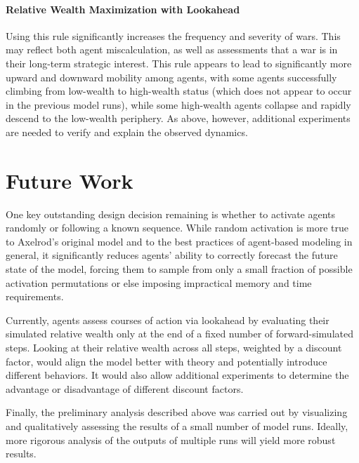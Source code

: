 \documentclass{article}
\begin{document}
\paragraph{Relative Wealth Maximization with Lookahead}

Using this rule significantly increases the frequency and severity of wars. This may reflect both agent miscalculation, as well as assessments that a war is in their long-term strategic interest. This rule appears to lead to significantly more upward and downward mobility among agents, with some agents successfully climbing from low-wealth to high-wealth status (which does not appear to occur in the previous model runs), while some high-wealth agents collapse and rapidly descend to the low-wealth periphery. As above, however, additional experiments are needed to verify and explain the observed dynamics.

\section{Future Work}
One key outstanding design decision remaining is whether to activate agents randomly or following a known sequence. While random activation is more true to Axelrod's original model and to the best practices of agent-based modeling in general, it significantly reduces agents' ability to correctly forecast the future state of the model, forcing them to sample from only a small fraction of possible activation permutations or else imposing impractical memory and time requirements. 

Currently, agents assess courses of action via lookahead by evaluating their simulated relative wealth only at the end of a fixed number of forward-simulated steps. Looking at their relative wealth across all steps, weighted by a discount factor, would align the model better with theory and potentially introduce different behaviors. It would also allow additional experiments to determine the advantage or disadvantage of different discount factors.

Finally, the preliminary analysis described above was carried out by visualizing and qualitatively assessing the results of a small number of model runs. Ideally, more rigorous analysis of the outputs of multiple runs will yield more robust results.



\end{document}
